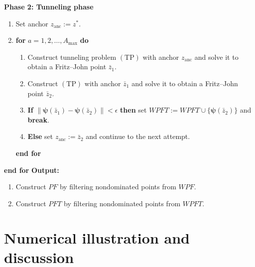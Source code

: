 \documentclass[amsa]{ipart}
\theoremstyle{plain}
\numberwithin{equation}{section}
\newcommand{\xlm}{z^*}                    %
\newcommand{\fvec}{\boldsymbol{\psi}}         %
\begin{document}
\begin{algorithm}[H]                     
\begin{algorithmic} [1]                   %
\State \textbf{Phase 2: Tunneling phase}
\begin{enumerate}[label=(\alph*)]
  \item Set anchor $z_{\mathrm{anc}} := \xlm$.
  \item \textbf{for} $a=1,2,\dots,A_{\max}$ \textbf{do}
    \begin{enumerate}[label=(b\arabic*)]
      \item Construct tunneling problem $(\mathrm{TP})$ with anchor $z_{\mathrm{anc}}$ and solve it to obtain a Fritz--John point $\bar{z}_1$.
      \item Construct $(\mathrm{TP})$ with anchor $\bar{z}_1$ and solve it to obtain a Fritz--John point $\bar{z}_2$.
      \item \textbf{If} $\|\fvec(\bar{z}_1)-\fvec(\bar{z}_2)\|<\epsilon$ \textbf{then} set $WPFT := WPFT \cup \{\fvec(\bar{z}_2)\}$ and \textbf{break}.
      \item \textbf{Else} set $z_{\mathrm{anc}} := \bar{z}_2$ and continue to the next attempt.
    \end{enumerate}
  \textbf{end for}
\end{enumerate}
\State \textbf{end for} \;
\State \textbf{Output:}
\begin{enumerate}[label=(\alph*)]
    \item Construct $PF$ by filtering nondominated points from $WPF$.
    \item Construct $PFT$ by filtering nondominated points from $WPFT$.
\end{enumerate}

\end{algorithmic}
\end{algorithm}

\section{Numerical illustration and discussion}
\label{sec_exe}
\end{document}
